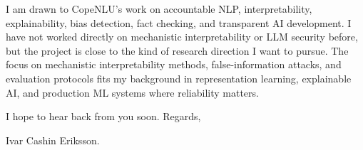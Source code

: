 \documentclass[11pt,a4paper]{moderncv}
\begin{document}
\hspace*{2em}
I am drawn to CopeNLU's work on accountable NLP, interpretability, explainability, bias detection, fact checking, and transparent AI development. I have not worked directly on mechanistic interpretability or LLM security before, but the project is close to the kind of research direction I want to pursue. The focus on mechanistic interpretability methods, false-information attacks, and evaluation protocols fits my background in representation learning, explainable AI, and production ML systems where reliability matters.

\vspace*{2em}
I hope to hear back from you soon. Regards,

\vspace*{1em}
Ivar Cashin Eriksson.
\end{document}
